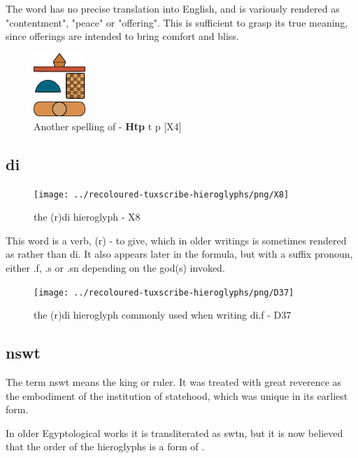 The word  has no precise translation into English, and is variously rendered as "contentment", "peace" or "offering". This is sufficient to grasp its true meaning, since offerings are intended to bring comfort and bliss.

\begin{figure} [H]
	\centering
	\includegraphics[width=0.175\textwidth]{../images/htp2}
	\caption{Another spelling of  - \textbf{Htp} t p [X4]}
\end{figure}

\subsection*{di}

\begin{figure} [H]
	\centering
	\texttt{[image: ../recoloured-tuxscribe-hieroglyphs/png/X8]}
	\caption{the (r)di hieroglyph - X8}
\end{figure}

This word is a verb, (r) - to give, which in older writings is sometimes rendered as  rather than di. It also appears later in the formula, but with a suffix pronoun, either .f, .s or .sn depending on the god(s) invoked.

\begin{figure} [H]
	\centering
	\texttt{[image: ../recoloured-tuxscribe-hieroglyphs/png/D37]}
	\caption{the (r)di hieroglyph commonly used when writing di.f - D37}
\end{figure}

\subsection*{nswt}

The term nswt means the king or ruler. It was treated with great reverence as the embodiment of the institution of statehood, which was unique in its earliest form.

In older Egyptological works it is transliterated as swtn, but it is now believed that the order of the hieroglyphs is a form of .

